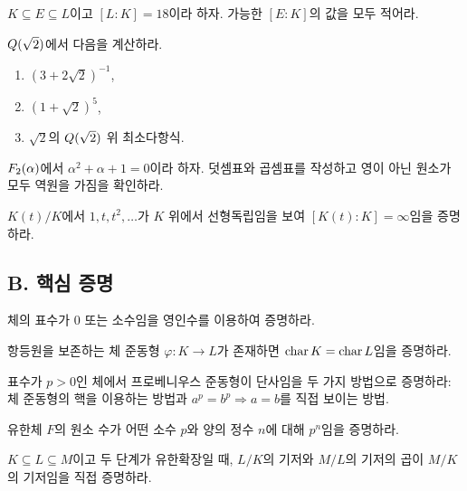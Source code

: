\begin{exercise}
$K\subseteq E\subseteq L$이고 $[L:K]=18$이라 하자. 가능한 $[E:K]$의 값을 모두 적어라.
\end{exercise}

\begin{exercise}[*]
$Q(\sqrt2)$에서 다음을 계산하라.
\begin{enumerate}[label=(\alph*)]
  \item $(3+2\sqrt2)^{-1}$,
  \item $(1+\sqrt2)^5$,
  \item $\sqrt2$의 $Q(\sqrt2)$ 위 최소다항식.
\end{enumerate}
\end{exercise}

\begin{exercise}
$F_2(\alpha)$에서 $\alpha^2+\alpha+1=0$이라 하자. 덧셈표와 곱셈표를 작성하고 영이 아닌 원소가 모두 역원을 가짐을 확인하라.
\end{exercise}

\begin{exercise}
$K(t)/K$에서 $1,t,t^2,\dots$가 $K$ 위에서 선형독립임을 보여 $[K(t):K]=\infty$임을 증명하라.
\end{exercise}

\subsection*{B. 핵심 증명}

\begin{exercise}
체의 표수가 $0$ 또는 소수임을 영인수를 이용하여 증명하라.
\end{exercise}

\begin{exercise}[*]
항등원을 보존하는 체 준동형 $\varphi:K\to L$가 존재하면 $\operatorname{char} K=\operatorname{char} L$임을 증명하라.
\end{exercise}

\begin{exercise}
표수가 $p>0$인 체에서 프로베니우스 준동형이 단사임을 두 가지 방법으로 증명하라: 체 준동형의 핵을 이용하는 방법과 $a^p=b^p\Rightarrow a=b$를 직접 보이는 방법.
\end{exercise}

\begin{exercise}[*]
유한체 $F$의 원소 수가 어떤 소수 $p$와 양의 정수 $n$에 대해 $p^n$임을 증명하라.
\end{exercise}

\begin{exercise}[*]
$K\subseteq L\subseteq M$이고 두 단계가 유한확장일 때, $L/K$의 기저와 $M/L$의 기저의 곱이 $M/K$의 기저임을 직접 증명하라.
\end{exercise}

